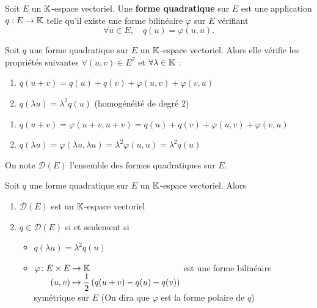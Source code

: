 \documentclass[a4paper,12pt]{article}
\begin{document}
\begin{definition}
    Soit $E$ un $\mathbb{K}$-espace vectoriel.
    Une \textbf{forme quadratique} sur $E$ est une application $q : E \to \mathbb{K}$ telle qu'il existe une forme bilinéaire $\varphi$ sur $E$ vérifiant
    $$
    \forall u \in E, \quad q(u) = \varphi(u, u).
    $$
\end{definition}

\begin{proposition}{}{}
    Soit $q$ une forme quadratique sur $E$ un $\mathbb{K}$-espace vectoriel.
    Alors elle vérifie les propriétés suivantes $\forall (u, v) \in E^2$ et $\forall \lambda \in \mathbb{K}$ :
    \begin{enumerate}
        \item $q(u + v) = q(u) + q(v) + \varphi(u, v) + \varphi(v, u)$
        \item $q(\lambda u) = \lambda^2 q(u)$ (homogénéité de degré 2)
    \end{enumerate}
\end{proposition}

\begin{demonstration}
    \begin{enumerate}
        \item $q(u + v) = \varphi(u + v, u + v) = q(u) + q(v) + \varphi(u, v) + \varphi(v, u)$
        \item $q(\lambda u) = \varphi(\lambda u, \lambda u) = \lambda^2 \varphi(u, u) = \lambda^2 q(u)$
    \end{enumerate}
\end{demonstration}

\begin{definition}
    On note $\mathcal{D}(E)$ l'ensemble des formes quadratiques sur $E$.
\end{definition}

\begin{proposition}{}{}
    Soit $q$ une forme quadratique sur $E$ un $\mathbb{K}$-espace vectoriel.
    Alors
    \begin{enumerate}
        \item $\mathcal{D}(E)$ est un $\mathbb{K}$-espace vectoriel
        \item $q \in \mathcal{D}(E)$ si et seulement si
        \begin{itemize}
            \item $q(\lambda u) = \lambda^2 q(u)$
            \item $\funcdef{\varphi}{E \times E}{\K}{(u, v)}{\dfrac{1}{2} \left( q(u + v) - q(u) - q(v) \right)}$ est une forme bilinéaire symétrique sur $E$
            (On dira que $\varphi$ est la forme polaire de $q$)
        \end{itemize}
    \end{enumerate}
\end{proposition}
\end{document}
